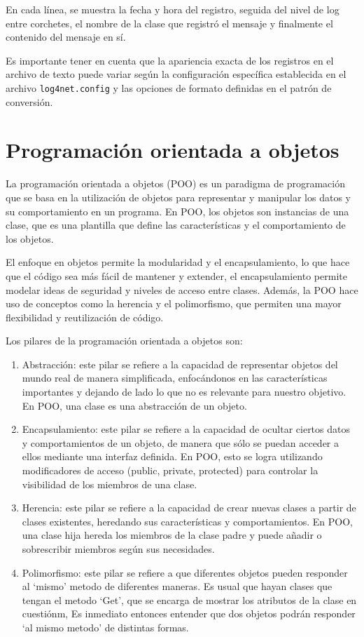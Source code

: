 \documentclass[executivepaper]{article}
\begin{document}
En cada línea, se muestra la fecha y hora del registro, seguida del nivel de log entre corchetes, el nombre de la clase que registró el mensaje y finalmente el contenido del mensaje en sí.

Es importante tener en cuenta que la apariencia exacta de los registros en el archivo de texto puede variar según la configuración específica establecida en el archivo \texttt{log4net.config} y las opciones de formato definidas en el patrón de conversión.

\section{Programación orientada a objetos}

La programación orientada a objetos (POO) es un paradigma de programación que se basa en la utilización de objetos para representar y manipular los datos y su comportamiento en un programa. En POO, los objetos son instancias de una clase, que es una plantilla que define las características y el comportamiento de los objetos.

El enfoque en objetos permite la modularidad y el encapsulamiento, lo que hace que el código sea más fácil de mantener y extender, el encapsulamiento permite modelar ideas de seguridad y niveles de acceso entre clases. Además, la POO hace uso de conceptos como la herencia y el polimorfismo, que permiten una mayor flexibilidad y reutilización de código.

Los pilares de la programación orientada a objetos son:

\begin{enumerate}
    \item Abstracción: este pilar se refiere a la capacidad de representar objetos del mundo real de manera simplificada, enfocándonos en las características importantes y dejando de lado lo que no es relevante para nuestro objetivo. En POO, una clase es una abstracción de un objeto.
    \item Encapsulamiento: este pilar se refiere a la capacidad de ocultar ciertos datos y comportamientos de un objeto, de manera que sólo se puedan acceder a ellos mediante una interfaz definida. En POO, esto se logra utilizando modificadores de acceso (public, private, protected) para controlar la visibilidad de los miembros de una clase.
    \item Herencia: este pilar se refiere a la capacidad de crear nuevas clases a partir de clases existentes, heredando sus características y comportamientos. En POO, una clase hija hereda los miembros de la clase padre y puede añadir o sobrescribir miembros según sus necesidades.
    \item Polimorfismo: este pilar se refiere a que diferentes objetos pueden responder al \enquote*{mismo} metodo de diferentes maneras. Es usual que hayan clases que tengan el metodo \enquote*{Get}, que se encarga de mostrar los atributos de la clase en cuestiónm, Es inmediato entonces entender que dos objetos podrán responder \enquote*{al mismo metodo} de distintas formas. 
\end{enumerate}
\end{document}

